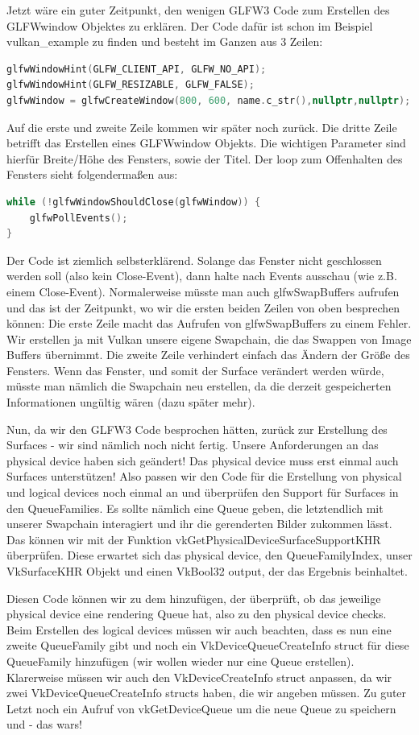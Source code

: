 \documentclass[11pt,a4paper]{report}
\begin{document}
Jetzt wäre ein guter Zeitpunkt, den wenigen GLFW3 Code zum Erstellen des GLFWwindow Objektes zu erklären. Der Code dafür ist schon im Beispiel vulkan\_example zu finden und besteht im Ganzen aus 3 Zeilen:
\begin{lstlisting}[language=C++]
glfwWindowHint(GLFW_CLIENT_API, GLFW_NO_API);
glfwWindowHint(GLFW_RESIZABLE, GLFW_FALSE);
glfwWindow = glfwCreateWindow(800, 600, name.c_str(),nullptr,nullptr);
\end{lstlisting}
Auf die erste und zweite Zeile kommen wir später noch zurück. Die dritte Zeile betrifft das Erstellen eines GLFWwindow Objekts. Die wichtigen Parameter sind hierfür Breite/Höhe des Fensters, sowie der Titel. Der loop zum Offenhalten des Fensters sieht folgendermaßen aus:
\begin{lstlisting}[language=C++]
while (!glfwWindowShouldClose(glfwWindow)) {
	glfwPollEvents();
}
\end{lstlisting}
Der Code ist ziemlich selbsterklärend. Solange das Fenster nicht geschlossen werden soll (also kein Close-Event), dann halte nach Events ausschau (wie z.B. einem Close-Event). Normalerweise müsste man auch glfwSwapBuffers aufrufen und das ist der Zeitpunkt, wo wir die ersten beiden Zeilen von oben besprechen können: Die erste Zeile macht das Aufrufen von glfwSwapBuffers zu einem Fehler. Wir erstellen ja mit Vulkan unsere eigene Swapchain, die das Swappen von Image Buffers übernimmt. Die zweite Zeile verhindert einfach das Ändern der Größe des Fensters. Wenn das Fenster, und somit der Surface verändert werden würde, müsste man nämlich die Swapchain neu erstellen, da die derzeit gespeicherten Informationen ungültig wären (dazu später mehr).

Nun, da wir den GLFW3 Code besprochen hätten, zurück zur Erstellung des Surfaces - wir sind nämlich noch nicht fertig. Unsere Anforderungen an das physical device haben sich geändert! Das physical device muss erst einmal auch Surfaces unterstützen! Also passen wir den Code für die Erstellung von physical und logical devices noch einmal an und überprüfen den Support für Surfaces in den QueueFamilies. Es sollte nämlich eine Queue geben, die letztendlich mit unserer Swapchain interagiert und ihr die gerenderten Bilder zukommen lässt. Das können wir mit der Funktion vkGetPhysicalDeviceSurfaceSupportKHR überprüfen. Diese erwartet sich das physical device, den QueueFamilyIndex, unser VkSurfaceKHR Objekt und einen VkBool32 output, der das Ergebnis beinhaltet.

Diesen Code können wir zu dem hinzufügen, der überprüft, ob das jeweilige physical device eine rendering Queue hat, also zu den physical device checks. Beim Erstellen des logical devices müssen wir auch beachten, dass es nun eine zweite QueueFamily gibt und noch ein VkDeviceQueueCreateInfo struct für diese QueueFamily hinzufügen (wir wollen wieder nur eine Queue erstellen). Klarerweise müssen wir auch den VkDeviceCreateInfo struct anpassen, da wir zwei VkDeviceQueueCreateInfo structs haben, die wir angeben müssen. Zu guter Letzt noch ein Aufruf von vkGetDeviceQueue um die neue Queue zu speichern und - das wars!
\end{document}
